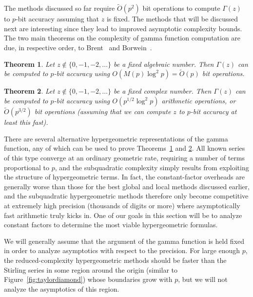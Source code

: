 \documentclass[reqno]{amsart}
\newcommand{\bigOtilde}{\widetilde O}
\newtheorem{theorem}{Theorem}[section]
\theoremstyle{definition}
\begin{document}
\label{sect:hypergeometric}

The methods discussed so far require $\bigOtilde(p^2)$ bit operations
to compute $\Gamma(z)$ to $p$-bit accuracy
assuming that $z$ is fixed.
The methods that will be discussed next are interesting since they lead to improved asymptotic complexity bounds.
The two main theorems on the complexity
of gamma function computation are due, in respective order, to Brent~\cite{Brent1976} and Borwein~\cite{Borwein1987,borwein1987pi}.

\begin{theorem}
Let $z \not \in \{0, -1, -2, \ldots\}$ be a fixed algebraic number.
Then $\Gamma(z)$ can be computed to $p$-bit accuracy using $O(M(p) \log^2p) = \bigOtilde(p)$ bit operations.
\label{thm:complexityalg}
\end{theorem}

\begin{theorem}
Let $z \not \in \{0, -1, -2, \ldots\}$ be a fixed complex number.
Then $\Gamma(z)$ can be computed to $p$-bit accuracy using $O(p^{1/2} \log^2 p)$ arithmetic operations,
or $\bigOtilde(p^{3/2})$ bit operations
(assuming that we can compute $z$ to $p$-bit accuracy at least this fast).
\label{thm:complexitygen}
\end{theorem}

There are several
alternative hypergeometric representations
of the gamma function, any of which can
be used to prove Theorems~\ref{thm:complexityalg} and \ref{thm:complexitygen}.
All known series of this type
converge at an ordinary geometric rate, requiring
a number of terms proportional to $p$,
and the subquadratic complexity
simply results from exploiting the structure of hypergeometric terms.
In fact, the constant-factor overheads
are generally worse than those for the best global and local methods
discussed earlier, and the subquadratic hypergeometric
methods therefore only become competitive at extremely high precision
(thousands of digits or more)
where asymptotically fast arithmetic truly kicks in.
One of our goals in this section will be to
analyze constant factors
to determine the most viable hypergeometric formulas.

We will generally assume that the argument
of the gamma function is held fixed
in order to analyze asymptotics with respect to the precision.
For large enough $p$,
the reduced-complexity hypergeometric methods should be faster
than the Stirling series in some region around the origin
(similar to Figure~\ref{fig:taylordiamond})
whose boundaries grow
with $p$, but we will
not analyze the asymptotics of this region.
\end{document}
